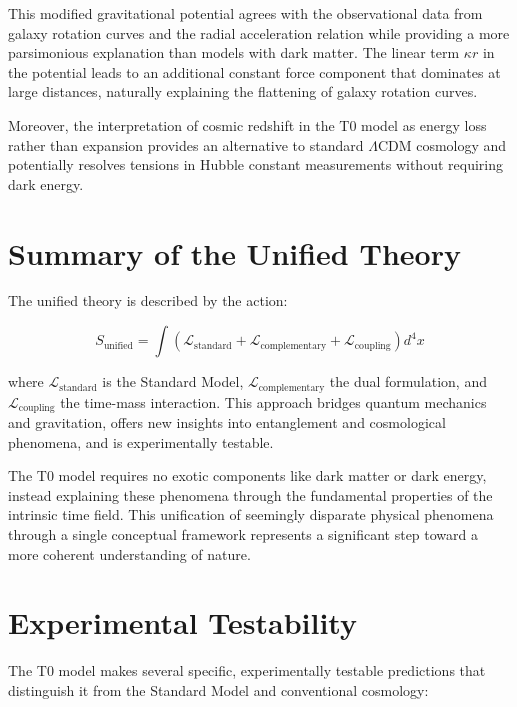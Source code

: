 \documentclass[a4paper,12pt]{article}
\begin{document}
	This modified gravitational potential agrees with the observational data from galaxy rotation curves \cite{rubin1980} and the radial acceleration relation \cite{McGaugh2016} while providing a more parsimonious explanation than models with dark matter. The linear term $\kappa r$ in the potential leads to an additional constant force component that dominates at large distances, naturally explaining the flattening of galaxy rotation curves.
	
	Moreover, the interpretation of cosmic redshift in the T0 model as energy loss rather than expansion provides an alternative to standard $\Lambda$CDM cosmology \cite{Planck2018} and potentially resolves tensions in Hubble constant measurements without requiring dark energy.
	
	\section{Summary of the Unified Theory}
	
	The unified theory is described by the action:
	
	\begin{equation}
		S_\text{unified} = \int \left( \mathcal{L}_\text{standard} + \mathcal{L}_\text{complementary} + \mathcal{L}_\text{coupling} \right) d^4x
	\end{equation}
	
	where $\mathcal{L}_\text{standard}$ is the Standard Model, $\mathcal{L}_\text{complementary}$ the dual formulation, and $\mathcal{L}_\text{coupling}$ the time-mass interaction. This approach bridges quantum mechanics and gravitation, offers new insights into entanglement and cosmological phenomena, and is experimentally testable.
	
	The T0 model requires no exotic components like dark matter or dark energy, instead explaining these phenomena through the fundamental properties of the intrinsic time field. This unification of seemingly disparate physical phenomena through a single conceptual framework represents a significant step toward a more coherent understanding of nature.
	
	\section{Experimental Testability}
	
	The T0 model makes several specific, experimentally testable predictions that distinguish it from the Standard Model and conventional cosmology:
	
\end{document}
